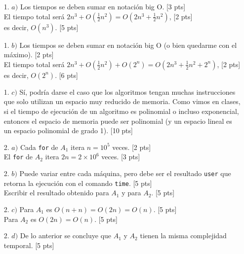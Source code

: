 \documentclass[letter,12pt,oneside]{book}
\theoremstyle{definition}
\begin{document}
\begin{enumerate}
    \item[1. $a)$] Los tiempos se deben sumar en notación big O.\tabto{82ex} [3 pts]\\
    El tiempo total será $2n^3+O(\frac{1}{2}n^2)=O(2n^3+\frac{1}{2}n^2)$,\tabto{82ex} [2 pts]\\
    es decir, $O(n^3)$.\tabto{82ex} [5 pts]
    \item[1. $b)$] Los tiempos se deben sumar en notación big O (o bien quedarme con el máximo).\tabto{82ex} [2 pts]\\
    El tiempo total será $2n^3+O(\frac{1}{2}n^2)+O(2^n)=O(2n^3+\frac{1}{2}n^2+2^n)$,\tabto{82ex} [2 pts]\\
    es decir, $O(2^n)$.\tabto{82ex} [6 pts]
    \item[1. $c)$] Sí, podría darse el caso que los algoritmos tengan muchas instrucciones que solo utilizan un espacio muy reducido de memoria. Como vimos en clases, si el tiempo de ejecución de un algoritmo es polinomial o incluso exponencial, entonces el espacio de memoria puede ser polinomial (y un espacio lineal es un espacio polinomial de grado 1). \tabto{81ex} [10 pts]
    \item[2. $a)$] Cada \texttt{for} de $A_1$ itera $n=10^5$ veces. \tabto{82ex} [2 pts]\\
    El \texttt{for} de $A_2$ itera $2n=2\times10^6$ veces. \tabto{82ex} [3 pts]
    \item[2. $b)$] Puede variar entre cada máquina, pero debe ser el resultado \texttt{user} que retorna la ejecución con el comando \texttt{time}. \tabto{82ex} [5 pts]\\
    Escribir el resultado obtenido para $A_1$ y para $A_2$. \tabto{82ex} [5 pts]
    \item[2. $c)$] Para $A_1$ es $O(n+n)=O(2n)=O(n)$.\tabto{82ex} [5 pts]\\
    Para $A_2$ es $O(2n)=O(n)$.\tabto{82ex} [5 pts]
    \item[2. $d)$] De lo anterior se concluye que $A_1$ y $A_2$ tienen la misma complejidad temporal.\tabto{82ex} [5 pts]\\
\end{enumerate}
\end{document}
